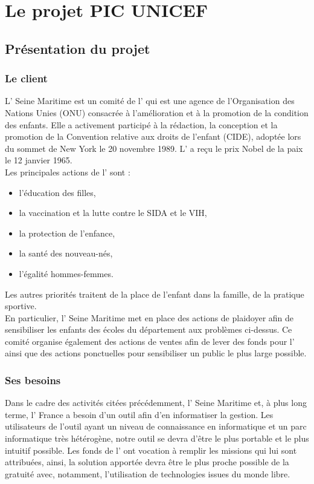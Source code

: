 \documentclass[asi]{picInsa}
\begin{document}
\chapter{Le projet PIC UNICEF}
\label{le_projet}

\section{Présentation du projet}
\subsection*{Le client}
L'\nomClient{} Seine Maritime est un comité de l'\nomClient{} qui est une agence de l'Organisation des Nations Unies (ONU) consacrée à l'amélioration et à la promotion de la condition des enfants. Elle a activement participé à la rédaction, la conception et la promotion de la Convention relative aux droits de l'enfant (CIDE), adoptée lors du sommet de New York le 20 novembre 1989. L'\nomClient{} a reçu le prix Nobel de la paix le 12 janvier 1965. \\
Les principales actions de l'\nomClient{} sont : \begin{itemize}
\item l'éducation des filles,
\item la vaccination et la lutte contre le SIDA et le VIH,
\item la protection de l'enfance,
\item la santé des nouveau-nés,
\item l'égalité hommes-femmes.
\end{itemize}
Les autres priorités traitent de la place de l'enfant dans la famille, de la pratique sportive.\\
En particulier, l'\nomClient{} Seine Maritime met en place des actions de plaidoyer afin de sensibiliser les enfants des écoles du département aux problèmes ci-dessus. Ce comité organise également des actions de ventes afin de lever des fonds pour l'\nomClient{} ainsi que des actions ponctuelles pour sensibiliser un public le plus large possible.

\subsection*{Ses besoins}
Dans le cadre des activités citées précédemment, l'\nomClient{} Seine Maritime et, à plus long terme, l'\nomClient{} France a besoin d'un outil afin d'en informatiser la gestion. Les utilisateurs de l'outil ayant un niveau de connaissance en informatique et un parc informatique très hétérogène, notre outil se devra d'être le plus portable et le plus intuitif possible. Les fonds de l'\nomClient{} ont vocation à remplir les missions qui lui sont attribuées, ainsi, la solution apportée devra être le plus proche possible de la gratuité avec, notamment, l'utilisation de technologies issues du monde libre. \newpage
\end{document}
